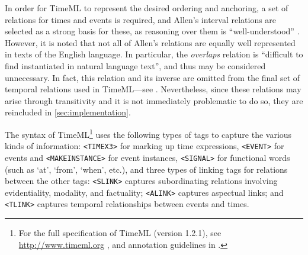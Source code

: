 \documentclass[a4paper,12pt,leqno]{article}
\newcommand{\citeneeded}[1][]{{\color{red}[Citation needed!#1]}}
\begin{document}
In order for TimeML to represent the desired ordering and anchoring, a set of relations for times and events is required, and Allen's interval relations are selected as a strong basis for these, as reasoning over them is ``well-understood'' \citep[p. 138]{Pustejovsky2005}. However, it is noted that not all of Allen's relations are equally well represented in texts of the English language. In particular, the \textit{overlaps} relation is ``difficult to find instantiated in natural language text'', and thus may be considered unnecessary. In fact, this relation and its inverse are omitted from the final set of temporal relations used in TimeML---see . Nevertheless, since these relations may arise through transitivity and it is not immediately problematic to do so, they are reincluded in \cref{sec:implementation}.

The syntax of TimeML\footnote{For the full specification of TimeML (version 1.2.1), see \url{http://www.timeml.org} \citep{timeml2005timeml}, and annotation guidelines in \citet{sauri2006timeml}.} %
uses the following types of tags to capture the various kinds of information: \verb|<TIMEX3>| for marking up time expressions, \verb|<EVENT>| for events and \verb|<MAKEINSTANCE>| for event instances, \verb|<SIGNAL>| for functional words (such as `at', `from', `when', etc.), and three types of linking tags for relations between the other tags: \verb|<SLINK>| captures subordinating relations involving evidentiality, modality, and factuality; \verb|<ALINK>| captures aspectual links; and \verb|<TLINK>| captures temporal relationships between events and times.
\end{document}

